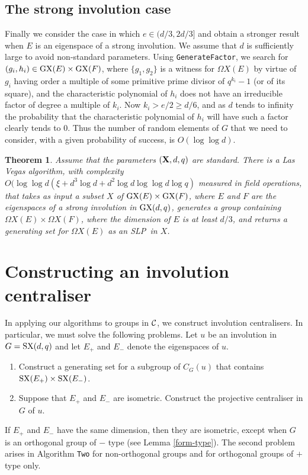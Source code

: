 \documentclass[12pt]{article}
\newtheorem{theorem}[definition]{Theorem}
\def\Oh{O}  %
\def\C{{\cal C}}
\def\SX{{\rm SX}}
\def\GX{{\rm GX}}
\def\X{{\rm X}}
\def\X{{\bf X}}
\def\SLP{{\rm SLP}}
\begin{document}
\subsection{The strong involution case}
Finally we consider the case in which $e\in (d/3,2d/3]$
and obtain a stronger result when $E$ is an eigenspace of 
a strong involution.
We assume that $d$ is sufficiently large to avoid non-standard 
parameters.  Using {\tt GenerateFactor}, we search
for $(g_i,h_i) \in \GX(E)\times\GX(F)$, where $\{g_1, g_2\}$ is 
a witness for $\Omega X(E)$ by virtue of $g_i$ having order a multiple of
some primitive prime divisor of $q^{k_i}-1$ (or of its square), and
the characteristic polynomial of $h_i$ does not have 
an irreducible factor of degree a multiple of $k_i$.
Now $k_i>e/2\ge d/6$, and as $d$ tends to 
infinity the probability that the
characteristic polynomial of $h_i$ will have such a factor clearly 
tends to 0.  Thus the number of
random elements of $G$ that we need to consider, with a given 
probability of success, is  $O(\log \log d)$.

\begin{theorem}  Assume that the parameters $(\X, d, q)$ are standard.
There is a Las Vegas algorithm, with 
complexity $\Oh(\log \log d (\xi +d^3 \log d + d^2\log d \log\log d \log q)$ 
measured in field operations, that takes as input a
subset $X$ of $\GX(E)\times\GX(F)$, where $E$ and $F$ are the 
eigenspaces of a strong involution in $\GX(d,q)$, generates a group
containing $\Omega X(E)\times\Omega X(F)$, where the dimension 
of $E$ is at least $d/3$,
and returns a generating set for $\Omega X(E)$  as an \SLP\ in $X$.
\end{theorem}

\section{Constructing an involution centraliser}
\label{Bray}
In applying our algorithms to groups  in $\C$,
we construct involution centralisers.
In particular, we must solve the following problems.
Let $u$ be an involution in $G=\SX(d, q)$ and let 
$E_+$ and $E_-$ denote the eigenspaces of $u$. 
\begin{enumerate}
\item 
Construct a generating set for a subgroup of $C_G(u)$ 
that contains $\SX(E_+)\times \SX(E_-)$. 
\item 
Suppose that $E_+$ and $E_-$ are isometric. 
Construct the projective centraliser in $G$ of $u$.
\end{enumerate}
If $E_+$ and $E_-$ have the same dimension, then they are isometric, 
except when $G$ is an orthogonal group of $-$ type 
(see Lemma \ref{form-type}).
The second problem arises in Algorithm {\tt Two}
for non-orthogonal groups and for orthogonal groups of $+$ type only.
\end{document}
